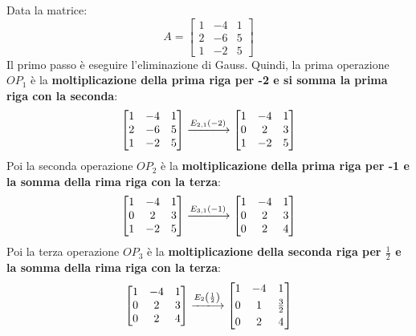 \documentclass[a4paper]{article}
\makeatletter
\newenvironment{rowequmatbra}[1]{\left[\array{@{}#1@{}}}{\endarray\right]}
\makeatother
\begin{document}
	Data la matrice:
	\begin{equation*}
		A = \begin{bmatrix}
			1 & -4 & 1 \\
			2 & -6 & 5 \\
			1 & -2 & 5
		\end{bmatrix}
	\end{equation*}
	Il \textcolor{Red3}{primo passo} è eseguire l'eliminazione di Gauss. Quindi, la prima operazione $OP_{1}$ è la \textbf{moltiplicazione della prima riga per -2 e si somma la prima riga con la seconda}:
	\begin{equation*}
		\begin{rowequmatbra}{ccc}
			1 & -4 & 1 \\
			2 & -6 & 5 \\
			1 & -2 & 5
		\end{rowequmatbra} \xlongrightarrow{E_{2,1}\left(-2\right)}
		\begin{rowequmatbra}{ccc}
			1 & -4 & 1 \\
			0 &  2 & 3 \\
			1 & -2 & 5
		\end{rowequmatbra}
	\end{equation*}
	Poi la seconda operazione $OP_{2}$ è la \textbf{moltiplicazione della prima riga per -1 e la somma della rima riga con la terza}:
	\begin{equation*}
		\begin{rowequmatbra}{ccc}
			1 & -4 & 1 \\
			0 &  2 & 3 \\
			1 & -2 & 5
		\end{rowequmatbra} \xlongrightarrow{E_{3,1}\left(-1\right)}
		\begin{rowequmatbra}{ccc}
			1 & -4 & 1 \\
			0 &  2 & 3 \\
			0 &  2 & 4
		\end{rowequmatbra}
	\end{equation*}
	Poi la terza operazione $OP_{3}$ è la \textbf{moltiplicazione della seconda riga per $\frac{1}{2}$ e la somma della rima riga con la terza}:
	\begin{equation*}
		\begin{rowequmatbra}{ccc}
			1 & -4 & 1 \\
			0 &  2 & 3 \\
			0 &  2 & 4
		\end{rowequmatbra} \xlongrightarrow{E_{2}\left(\frac{1}{2}\right)}
		\begin{rowequmatbra}{ccc}
			1 & -4 & 1 \\ [0.3em]
			0 &  1 & \frac{3}{2} \\ [0.3em]
			0 &  2 & 4
		\end{rowequmatbra}
	\end{equation*}
\end{document}
